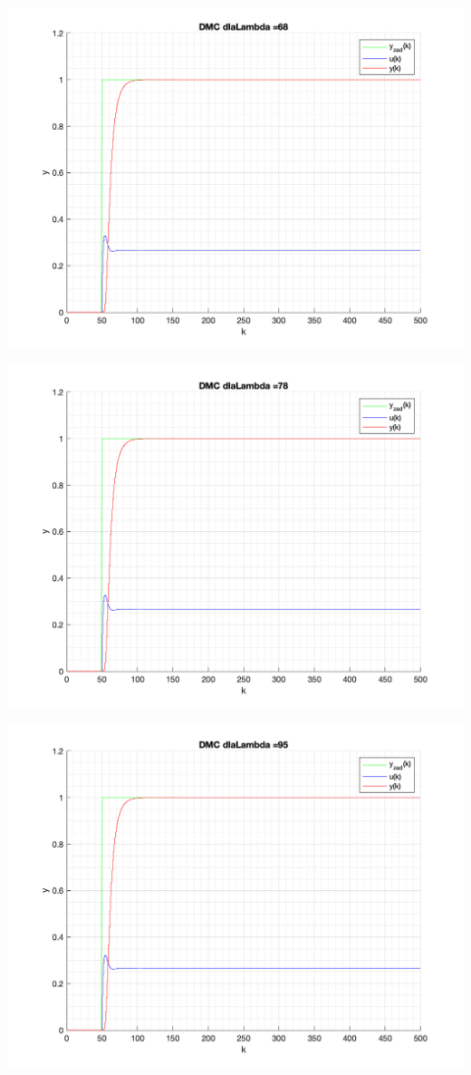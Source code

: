 \documentclass[a4paper, 11pt]{article}
\begin{document}
\begin{enumerate}
 \includegraphics[width=\linewidth]{./ModelsP4_Lambda/P4_DMC_Lambda_68_png.png} 
 
 \includegraphics[width=\linewidth]{./ModelsP4_Lambda/P4_DMC_Lambda_78_png.png} 
 
 \includegraphics[width=\linewidth]{./ModelsP4_Lambda/P4_DMC_Lambda_95_png.png} 
 

\end{enumerate}
\end{document}
